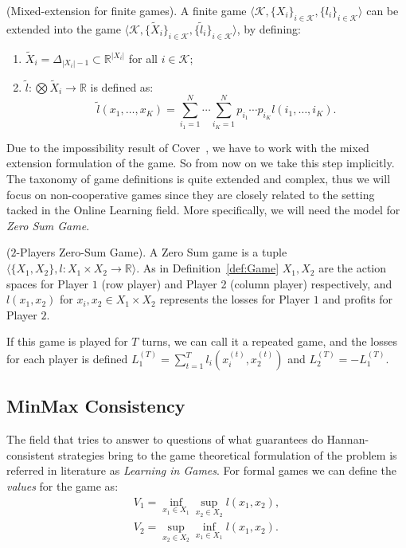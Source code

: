 \begin{definition}(Mixed-extension for finite games).
A finite game $\langle\mathcal K,\{X_i\}_{i\in\mathcal K},\{l_i\}_{i\in\mathcal K}\rangle$ can be extended into the game $\langle\mathcal K,\{\tilde X_i\}_{i\in\mathcal K},\{\tilde l_i\}_{i\in\mathcal K}\rangle$, by defining:
\begin{enumerate}
	\item $\tilde X_i=\Delta_{|X_i|-1}\subset \mathbb R^{|X_i|}$ for all $i\in\mathcal K$;
	\item $\tilde l:\bigotimes \tilde X_i\to\mathbb R$ is defined as:
	$$\tilde l(x_1,\ldots,x_K)=\sum\limits_{i_1=1}^N\cdots\sum\limits_{i_K=1}^Np_{i_1}\cdots p_{i_K}l(i_1,\ldots,i_K).$$ 
\end{enumerate}
\end{definition}

Due to the impossibility result of Cover~\cite{cover1966behavior}, we have to work with the mixed extension formulation of the game. So from now on we take this step implicitly.
The taxonomy of game definitions is quite extended and complex, thus we will focus on non-cooperative games \cite{nash1951non} since they are closely related to the setting tacked in the Online Learning field. More specifically, we will need the model for \emph{Zero Sum Game}. 

\begin{definition}($2$-Players Zero-Sum Game).\label{def:ZSG}
A Zero Sum game is a tuple $\langle\{X_1,X_2\},l:X_1\times X_2\to\mathbb R\rangle$. As in Definition~\ref{def:Game} $X_1,X_2$ are the action spaces for Player $1$ (row player) and Player 2 (column player) respectively, and $l(x_1,x_2)$ for $x_i,x_2\in X_1\times X_2$ represents the losses for Player $1$ and profits for Player $2$.
\end{definition}

If this game is played for $T$ turns, we can call it a repeated game, and the losses for each player is defined $L_1^{(T)}=\sum\limits_{t=1}^Tl_i\left(x_i^{(t)},x_2^{(t)}\right)$ and $L_2^{(T)}=-L_1^{(T)}$. 

\subsection{MinMax Consistency}
The field that tries to answer to questions of what guarantees do Hannan-consistent strategies bring to the game theoretical formulation of the problem is referred in literature as \emph{Learning in Games}.
For formal games we can define the \emph{values} for the game as: 
\begin{align}
    V_1=\inf\limits_{x_1\in X_1}\sup\limits_{x_2\in X_2}l(x_1,x_2),\\
	V_2=\sup\limits_{x_2\in X_2}\inf\limits_{x_1\in X_1}l(x_1,x_2).
\end{align}

